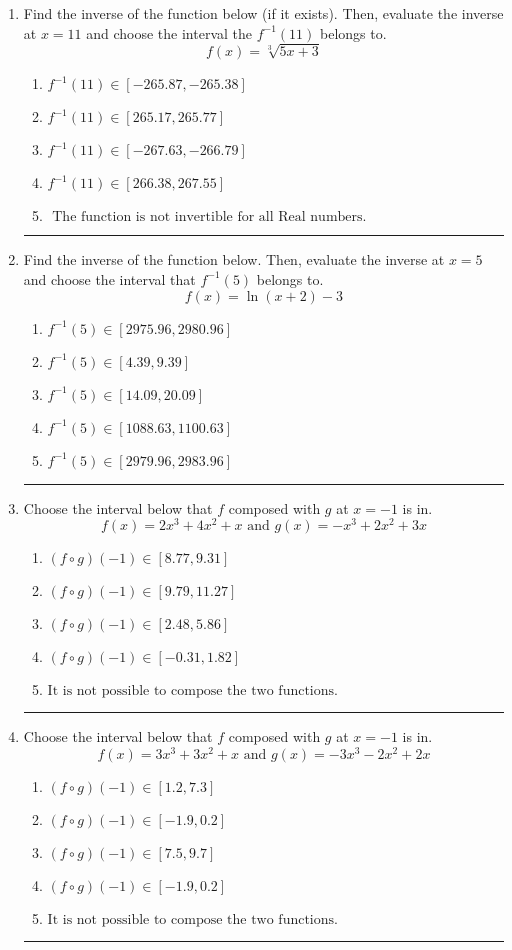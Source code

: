 \documentclass[14pt]{extbook}
\newcommand{\litem}[1]{\item#1\hspace*{-1cm}\rule{\textwidth}{0.4pt}}
\begin{document}
\begin{enumerate}
{\begin{enumerate}[label=\Alph*.]
\end{enumerate} }
\litem{
Find the inverse of the function below (if it exists). Then, evaluate the inverse at $x = 11$ and choose the interval the $f^{-1}(11)$ belongs to.\[ f(x) = \sqrt[3]{5 x + 3} \]\begin{enumerate}[label=\Alph*.]
\item \( f^{-1}(11) \in [-265.87, -265.38] \)
\item \( f^{-1}(11) \in [265.17, 265.77] \)
\item \( f^{-1}(11) \in [-267.63, -266.79] \)
\item \( f^{-1}(11) \in [266.38, 267.55] \)
\item \( \text{ The function is not invertible for all Real numbers. } \)

\end{enumerate} }
\litem{
Find the inverse of the function below. Then, evaluate the inverse at $x = 5$ and choose the interval that $f^{-1}(5)$ belongs to.\[ f(x) = \ln{(x+2)}-3 \]\begin{enumerate}[label=\Alph*.]
\item \( f^{-1}(5) \in [2975.96, 2980.96] \)
\item \( f^{-1}(5) \in [4.39, 9.39] \)
\item \( f^{-1}(5) \in [14.09, 20.09] \)
\item \( f^{-1}(5) \in [1088.63, 1100.63] \)
\item \( f^{-1}(5) \in [2979.96, 2983.96] \)

\end{enumerate} }
\litem{
Choose the interval below that $f$ composed with $g$ at $x=-1$ is in.\[ f(x) = 2x^{3} +4 x^{2} +x \text{ and } g(x) = -x^{3} +2 x^{2} +3 x \]\begin{enumerate}[label=\Alph*.]
\item \( (f \circ g)(-1) \in [8.77, 9.31] \)
\item \( (f \circ g)(-1) \in [9.79, 11.27] \)
\item \( (f \circ g)(-1) \in [2.48, 5.86] \)
\item \( (f \circ g)(-1) \in [-0.31, 1.82] \)
\item \( \text{It is not possible to compose the two functions.} \)

\end{enumerate} }
\litem{
Choose the interval below that $f$ composed with $g$ at $x=-1$ is in.\[ f(x) = 3x^{3} +3 x^{2} +x \text{ and } g(x) = -3x^{3} -2 x^{2} +2 x \]\begin{enumerate}[label=\Alph*.]
\item \( (f \circ g)(-1) \in [1.2, 7.3] \)
\item \( (f \circ g)(-1) \in [-1.9, 0.2] \)
\item \( (f \circ g)(-1) \in [7.5, 9.7] \)
\item \( (f \circ g)(-1) \in [-1.9, 0.2] \)
\item \( \text{It is not possible to compose the two functions.} \)


\end{enumerate}}
\end{enumerate}
\end{document}
